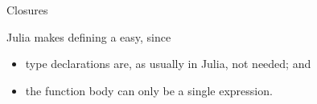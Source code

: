 \begin{comment}
\begin{exercise}
  \label{ex:cpp-funcloop3}
  Suppose a function
\begin{lstlisting}
bool f(int);
\end{lstlisting}
is given, which computes some property of integers.
Write a code fragment that tests if $f(i)$ is true for some $0\leq
i<100$, and if so, prints a message.
\end{exercise}

\begin{exercise}
  \label{ex:cpp-funcloop4}
  Suppose a function
\begin{lstlisting}
bool f(int);
\end{lstlisting}
is given, which computes some property of integers.
Write a main program that tests if $f(i)$ is true for all $0\leq
i<100$, and if so, prints a message.
\end{exercise}

\end{comment}

 {Closures}

Julia makes defining a  easy,
since 
\begin{itemize}
\item type declarations are, as usually in Julia, not needed; and
\item the function body can only be a single expression.
\end{itemize}

